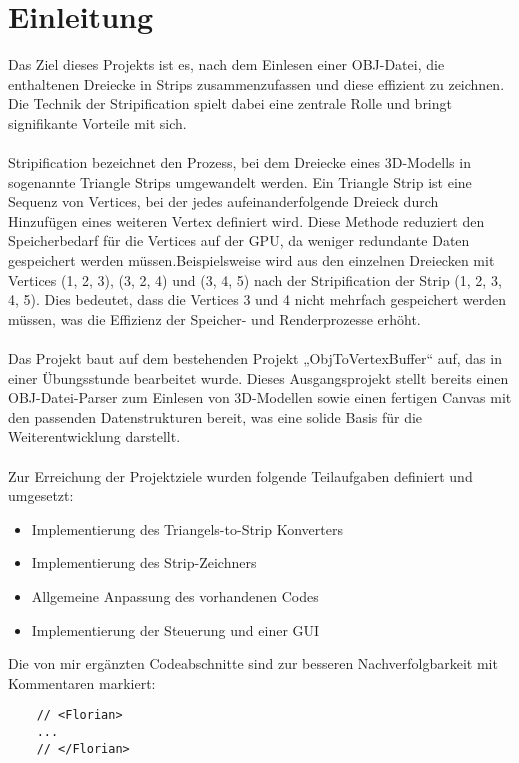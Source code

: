 \chapter{Einleitung}

Das Ziel dieses Projekts ist es, nach dem Einlesen einer OBJ-Datei, die
enthaltenen Dreiecke in Strips zusammenzufassen und diese effizient zu zeichnen.
Die Technik der Stripification spielt dabei eine zentrale Rolle und bringt
signifikante Vorteile mit sich.
\\
\\
Stripification bezeichnet den Prozess, bei dem Dreiecke eines 3D-Modells in
sogenannte Triangle Strips umgewandelt werden. Ein Triangle Strip ist eine
Sequenz von Vertices, bei der jedes aufeinanderfolgende Dreieck durch Hinzufügen
eines weiteren Vertex definiert wird. Diese Methode reduziert den Speicherbedarf
für die Vertices auf der GPU, da weniger redundante Daten gespeichert werden
müssen.Beispielsweise wird aus den einzelnen Dreiecken mit Vertices (1, 2, 3),
(3, 2, 4) und (3, 4, 5) nach der Stripification der Strip (1, 2, 3, 4, 5). Dies
bedeutet, dass die Vertices 3 und 4 nicht mehrfach gespeichert werden müssen,
was die Effizienz der Speicher- und Renderprozesse erhöht. 
\\
\\
Das Projekt baut auf dem bestehenden Projekt „ObjToVertexBuffer“ auf, das in
einer Übungsstunde bearbeitet wurde. Dieses Ausgangsprojekt stellt bereits einen
OBJ-Datei-Parser zum Einlesen von 3D-Modellen sowie einen fertigen Canvas mit
den passenden Datenstrukturen bereit, was eine solide Basis für die
Weiterentwicklung darstellt.
\\
\\
Zur Erreichung der Projektziele wurden folgende Teilaufgaben definiert und
umgesetzt:
\begin{itemize}
    \item Implementierung des Triangels-to-Strip Konverters
    \item Implementierung des Strip-Zeichners
    \item Allgemeine Anpassung des vorhandenen Codes
    \item Implementierung der Steuerung und einer GUI
\end{itemize}
\hfil \break
Die von mir ergänzten Codeabschnitte sind zur besseren Nachverfolgbarkeit mit
Kommentaren markiert:

\begin{lstlisting}
    // <Florian>
    ...
    // </Florian>
\end{lstlisting}